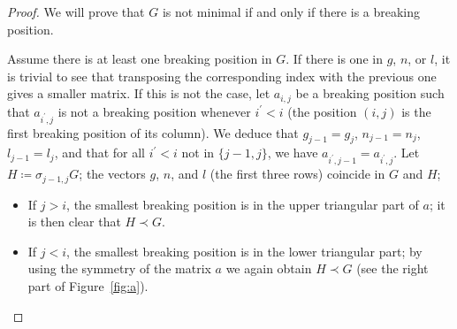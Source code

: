\documentclass{amsart}
\theoremstyle{plain}
\theoremstyle{definition}
\begin{document}
\begin{proof}
  We will prove that $G$ is not minimal if and only if there is a
  breaking position.

  Assume there is at least one breaking position in $G$. If there is
  one in $g$, $n$, or $l$, it is trivial to see that transposing the
  corresponding index with the previous one gives a smaller matrix. If
  this is not the case, let $a_{i,j}$ be a breaking position such that
  $a_{i^\prime,j}$ is not a breaking position whenever $i^\prime < i$
  (the position $(i,j)$ is the first breaking position of its
  column). We deduce that $g_{j-1} = g_j$, $n_{j-1} = n_j$, $l_{j-1} =
  l_j$, and that for all $i^\prime < i$ not in $\{j-1,j\}$, we have
  $a_{i^\prime, j-1} = a_{i^\prime, j}$. Let $H \coloneqq
  \sigma_{j-1,j} G$; the vectors $g$, $n$, and $l$ (the first three
  rows) coincide in $G$ and $H$;
  \begin{itemize}
  \item If $j > i$, the smallest breaking position is in the upper
    triangular part of $a$; it is then clear that $H \prec G$.
  \item If $j < i$, the smallest breaking position is in the lower
    triangular part; by using the symmetry of the matrix $a$ we again
    obtain $H \prec G$ (see the right part of Figure~\ref{fig:a}).
  \end{itemize}

  \begin{figure}[t]
\end{figure}
\end{proof}
\end{document}
